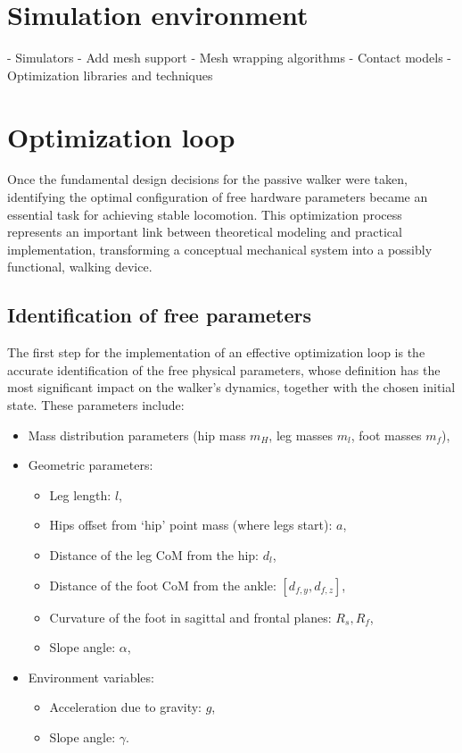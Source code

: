\chapter{Simulation environment}
- Simulators
- Add mesh support
- Mesh wrapping algorithms
- Contact models
- Optimization libraries and techniques



\chapter{Optimization loop}
Once the fundamental design decisions for the passive walker were taken, identifying the optimal configuration of free hardware parameters became an essential task for achieving stable locomotion.
This optimization process represents an important link between theoretical modeling and practical implementation, transforming a conceptual mechanical system into a possibly functional, walking device.

\section{Identification of free parameters}
The first step for the implementation of an effective optimization loop is the accurate identification of the free physical parameters, whose definition has the most significant impact on the walker's dynamics, together with the chosen initial state.
These parameters include:

\begin{itemize}
    \item Mass distribution parameters (hip mass $m_H$, leg masses $m_l$, foot masses $m_f$),
    \item Geometric parameters:
    \begin{itemize}
        \item Leg length: $l$,
        \item Hips offset from `hip' point mass (where legs start): $a$,
        \item Distance of the leg CoM from the hip: $d_l$,
        \item Distance of the foot CoM from the ankle: $[d_{f,y}, d_{f,z}]$,
        \item Curvature of the foot in sagittal and frontal planes: $R_s, R_f$,
        \item Slope angle: $\alpha$,
    \end{itemize}
    \item Environment variables:
    \begin{itemize}
        \item Acceleration due to gravity: $g$,
        \item Slope angle: $\gamma$.
    \end{itemize}
\end{itemize}

